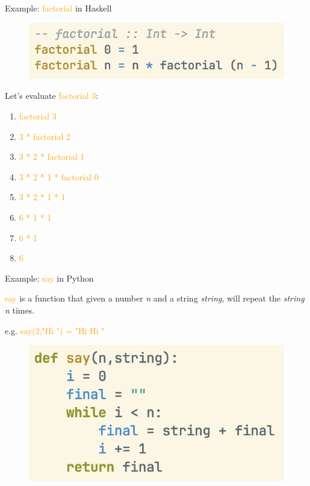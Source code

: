 \documentclass[pdf]{beamer}
\newcommand{\code}[1]{\textcolor{Orange}{\textsf{#1}}}
\begin{document}
\begin{frame}[fragile]{Example: \code{factorial} in Haskell}
    \begin{figure}[H]
    \centering
    \includegraphics[width=\linewidth]{factorial-hs}
  \end{figure}

  \pause
  Let's evaluate \code{factorial 3}:

  \begin{enumerate}
    \item<1-> \code{factorial 3}
    \item<2-> \code{3 * factorial 2}
    \item<3-> \code{3 * 2 * factorial 1}
    \item<4-> \code{3 * 2 * 1 * factorial 0}
    \item<5-> \code{3 * 2 * 1 * 1}
    \item<6-> \code{6 * 1 * 1}
    \item<7-> \code{6 * 1}
    \item<8-> \code{6}
  \end{enumerate}

\end{frame}

\begin{frame}[fragile]{Example: \code{say} in Python}

  \code{say} is a function that given a number \textit{n} and a string \textit{string}, will repeat the \textit{string} \textit{n} times.

  e.g. \code{say(2,"Hi ") = "Hi Hi "}

  \begin{figure}[H]
    \centering
    \includegraphics[width=\linewidth]{say-py}
  \end{figure}

\end{frame}
\end{document}
